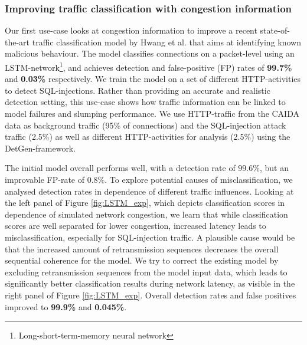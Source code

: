 \documentclass[sigconf]{acmart}
\begin{document}
\subsubsection{Improving traffic classification with congestion information}
Our first use-case looks at congestion information to improve a recent state-of-the-art  traffic classification model by Hwang et al. \cite{hwang2019lstm} that aims at identifying known malicious behaviour.
The model classifies connections on a packet-level using an LSTM-network\footnote{Long-short-term-memory neural network}, and achieves detection and false-positive (FP) rates of \textbf{99.7\%} and \textbf{0.03\%} respectively. We train the model on a set of different HTTP-activities to detect SQL-injections. Rather than providing an accurate and realistic detection setting, this use-case shows how traffic information can be linked to model failures and slumping performance.
We use HTTP-traffic from the CAIDA data as background traffic (95\% of connections) and the SQL-injection attack traffic (2.5\%) as well as different HTTP-activities for analysis (2.5\%) using the DetGen-framework.

The initial model overall performs well, with a detection rate of $99.6\%$, but an improvable FP-rate of $0.8\%$. To explore potential causes of misclassification, we analysed detection rates in dependence of different traffic influences. Looking at the left panel of Figure \ref{fig:LSTM_exp}, which depicts classification scores in dependence of simulated network congestion, we learn that while classification scores are well separated for lower congestion, increased latency leads to misclassification, especially for SQL-injection traffic. A plausible cause would be that the increased amount of retransmission sequences decreases the overall sequential coherence for the model. We try to correct the existing model by excluding retransmission sequences from the model input data, which leads to significantly better classification results during network latency, as visible in the right panel of Figure \ref{fig:LSTM_exp}. Overall detection rates and false positives improved to \textbf{99.9\%} and \textbf{0.045\%}.



\end{document}
